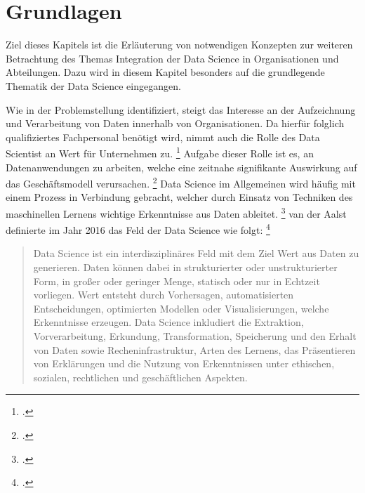 \chapter[Grundlagen]{Grundlagen}

Ziel dieses Kapitels ist die Erläuterung von notwendigen Konzepten zur weiteren Betrachtung des Themas Integration der Data Science in Organisationen und Abteilungen.
Dazu wird in diesem Kapitel besonders auf die grundlegende Thematik der Data Science eingegangen.

Wie in der Problemstellung identifiziert, steigt das Interesse an der Aufzeichnung und Verarbeitung von Daten innerhalb von Organisationen. 
Da hierfür folglich qualifiziertes Fachpersonal benötigt wird, nimmt auch die Rolle des Data Scientist an Wert für Unternehmen zu. \footcite[Vgl.][S. 1]{Fabijan.2017}
Aufgabe dieser Rolle ist es, an Datenanwendungen zu arbeiten, welche eine zeitnahe signifikante Auswirkung auf das Geschäftsmodell verursachen. \footcite[Vgl.][S. 12]{Patil.2011}
Data Science im Allgemeinen wird häufig mit einem Prozess in Verbindung gebracht, welcher durch Einsatz von Techniken des maschinellen Lernens wichtige Erkenntnisse aus Daten ableitet. \footcite[Vgl.][S. 1]{Zhang.2020b}
van der Aalst definierte im Jahr 2016 das Feld der Data Science wie folgt: \footcite[Vgl.][S. 10]{vanderAalst.2016}


\begin{quotation}
    Data Science ist ein interdisziplinäres Feld mit dem Ziel Wert aus Daten zu generieren.
    Daten können dabei in strukturierter oder unstrukturierter Form, in großer oder geringer Menge, statisch oder nur in Echtzeit vorliegen.
    Wert entsteht durch Vorhersagen, automatisierten Entscheidungen, optimierten Modellen oder Visualisierungen, welche Erkenntnisse erzeugen.
    Data Science inkludiert die Extraktion, Vorverarbeitung, Erkundung, Transformation, Speicherung und den Erhalt von Daten sowie Recheninfrastruktur, Arten des Lernens, das Präsentieren von Erklärungen und die Nutzung von Erkenntnissen unter ethischen, sozialen, rechtlichen und geschäftlichen Aspekten.
\end{quotation}

